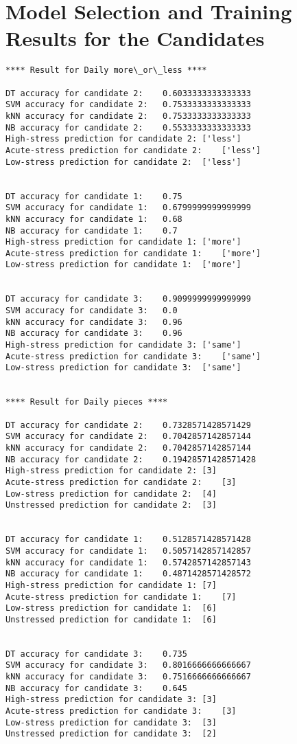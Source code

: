 \section{Model Selection and Training Results for the Candidates}\label{training-result}
\begin{lstlisting}
**** Result for Daily more\_or\_less ****

DT accuracy for candidate 2:	0.6033333333333333
SVM accuracy for candidate 2:	0.7533333333333333
kNN accuracy for candidate 2:	0.7533333333333333
NB accuracy for candidate 2:	0.5533333333333333
High-stress prediction for candidate 2:	['less']
Acute-stress prediction for candidate 2:	['less']
Low-stress prediction for candidate 2:	['less']


DT accuracy for candidate 1:	0.75
SVM accuracy for candidate 1:	0.6799999999999999
kNN accuracy for candidate 1:	0.68
NB accuracy for candidate 1:	0.7
High-stress prediction for candidate 1:	['more']
Acute-stress prediction for candidate 1:	['more']
Low-stress prediction for candidate 1:	['more']


DT accuracy for candidate 3:	0.9099999999999999
SVM accuracy for candidate 3:	0.0
kNN accuracy for candidate 3:	0.96
NB accuracy for candidate 3:	0.96
High-stress prediction for candidate 3:	['same']
Acute-stress prediction for candidate 3:	['same']
Low-stress prediction for candidate 3:	['same']


**** Result for Daily pieces ****

DT accuracy for candidate 2:	0.7328571428571429
SVM accuracy for candidate 2:	0.7042857142857144
kNN accuracy for candidate 2:	0.7042857142857144
NB accuracy for candidate 2:	0.19428571428571428
High-stress prediction for candidate 2:	[3]
Acute-stress prediction for candidate 2:	[3]
Low-stress prediction for candidate 2:	[4]
Unstressed prediction for candidate 2:	[3]


DT accuracy for candidate 1:	0.5128571428571428
SVM accuracy for candidate 1:	0.5057142857142857
kNN accuracy for candidate 1:	0.5742857142857143
NB accuracy for candidate 1:	0.4871428571428572
High-stress prediction for candidate 1:	[7]
Acute-stress prediction for candidate 1:	[7]
Low-stress prediction for candidate 1:	[6]
Unstressed prediction for candidate 1:	[6]


DT accuracy for candidate 3:	0.735
SVM accuracy for candidate 3:	0.8016666666666667
kNN accuracy for candidate 3:	0.7516666666666667
NB accuracy for candidate 3:	0.645
High-stress prediction for candidate 3:	[3]
Acute-stress prediction for candidate 3:	[3]
Low-stress prediction for candidate 3:	[3]
Unstressed prediction for candidate 3:	[2]



\end{lstlisting}
